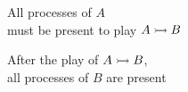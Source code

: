 \begin{frame}[c]
\begin{columns}
\begin{column}{.55\textwidth}
\begin{center}


\vspace*{.5cm}
All processes of $A$\\
must be present to play $\mbox{$A \rightarrowtail B$}$

\medskip
After the play of $\mbox{$A \rightarrowtail B$}$,\\
all processes of $B$ are present
% 
% 
% 

\end{center}
\end{column}
\end{columns}

\end{frame}
